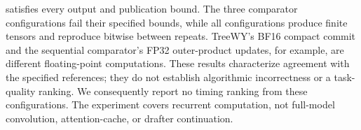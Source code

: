 \sys{} satisfies every output and publication bound. The three comparator configurations fail their specified bounds, while all configurations produce finite tensors and reproduce bitwise between repeats. TreeWY's BF16 compact commit and the sequential comparator's FP32 outer-product updates, for example, are different floating-point computations. These results characterize agreement with the specified references; they do not establish algorithmic incorrectness or a task-quality ranking. We consequently report no timing ranking from these configurations. The experiment covers recurrent computation, not full-model convolution, attention-cache, or drafter continuation.
